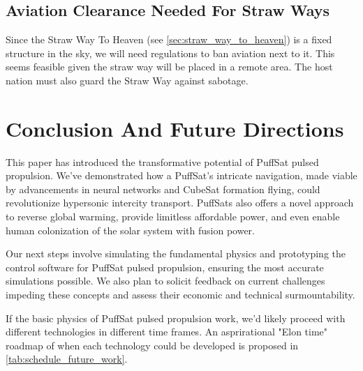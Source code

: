 \documentclass{article}
\begin{document}
\subsection{Aviation Clearance Needed For Straw Ways}
Since the Straw Way To Heaven (see \autoref{sec:straw_way_to_heaven}) is a fixed structure in the sky, we will need regulations to ban aviation next to it.   This seems feasible given the straw way will be placed in a remote area.   The host nation must also guard the Straw Way against sabotage.


\section{Conclusion And Future Directions}
This paper has introduced the transformative potential of PuffSat pulsed propulsion. We've demonstrated how a PuffSat's intricate navigation, made viable by advancements in neural networks and CubeSat formation flying, could revolutionize hypersonic intercity transport.  PuffSats also offers a novel approach to reverse global warming, provide limitless affordable power, and even enable human colonization of the solar system with fusion power. 

Our next steps involve simulating the fundamental physics and prototyping the control software for PuffSat pulsed propulsion, ensuring the most accurate simulations possible. We also plan to solicit feedback on current challenges impeding these concepts and assess their economic and technical surmountability.

If the basic physics of PuffSat pulsed propulsion work, we'd likely proceed with different technologies in different time frames.  An asprirational "Elon time" \cite{wiktionary_elon_time} roadmap of when each technology could be  developed is proposed in \autoref{tab:schedule_future_work}.
\end{document}
